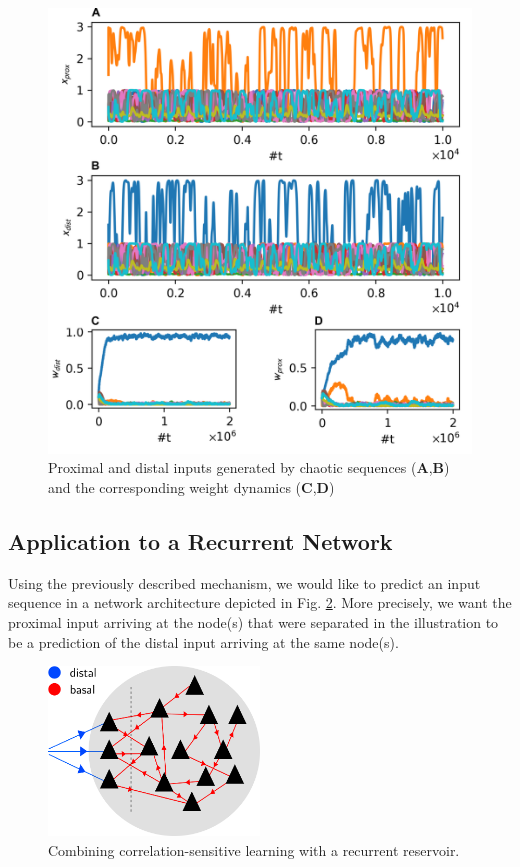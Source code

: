 \documentclass[10pt,a4paper]{article}
\begin{document}
\begin{figure}
\centering
\includegraphics[width=\textwidth]{./figures/dist_plast_comp.png}
\caption{Proximal and distal inputs generated by chaotic sequences ({\bf A},{\bf B}) and the corresponding weight dynamics ({\bf C},{\bf D})}
\label{fig:dist_plast_comp}
\end{figure}


\subsection{Application to a Recurrent Network}

Using the previously described mechanism, we would like to predict an input sequence in a network architecture depicted in Fig. \ref{fig:prox_dist_recurrent}. More precisely, we want the proximal input arriving at the node(s) that were separated in the illustration to be a prediction of the distal input arriving at the same node(s).
\begin{figure}
\centering
\includegraphics[width=0.5\textwidth]{./figures/prox_dist_rnn_illustration.png}
\caption{Combining correlation-sensitive learning with a recurrent reservoir.}
\label{fig:prox_dist_recurrent}
\end{figure}
\end{document}
